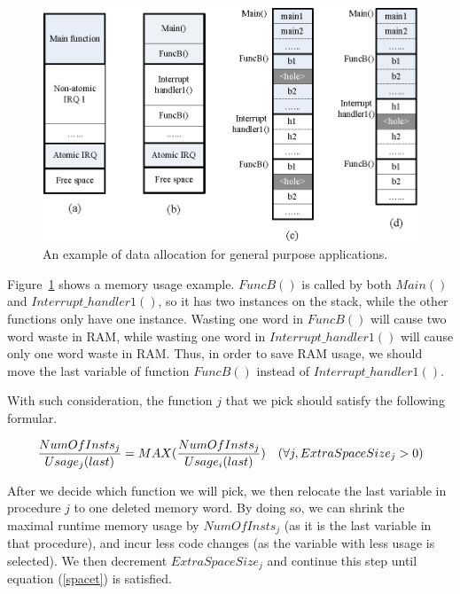 \begin{figure}[h]
\centering
\includegraphics[width=4.5in]{figures/stack.eps}
\caption{An example of data allocation for general purpose applications.}
\label{stack}
\end{figure}
Figure~\ref{stack} shows a memory usage example. 
$FuncB()$ is called by both $Main()$ and $Interrupt\_handler1()$, so
it has two instances on the stack, while the other functions only
have one instance. Wasting one word in $FuncB()$ will cause two word
waste in RAM, while wasting one word in $Interrupt\_handler1()$ will
cause only one word waste in RAM. Thus, in order to save RAM usage, we should
move the last variable of function $FuncB()$ instead of $Interrupt\_handler1()$.



With such consideration, the function $j$ that we pick should satisfy the following
formular.
\begin{small}
\begin{eqnarray}
{{NumOfInsts_j}\over{Usage_j(last)}} = MAX( {{NumOfInsts_j}\over{Usage_i(last)}} )~~~ {(\forall j, ExtraSpaceSize_j>0)}
\label{factor}
\end{eqnarray}
\end{small}

After we decide which function we will pick, we then relocate the last 
variable in procedure $j$ to one
deleted memory word. By doing so, we can shrink the maximal runtime
memory usage by $NumOfInsts_j$ (as it is the last variable in that
procedure), and incur less code changes (as the variable with less
usage is selected). We then decrement $ExtraSpaceSize_j$ and continue this step
until equation (\ref{spacet}) is satisfied.


